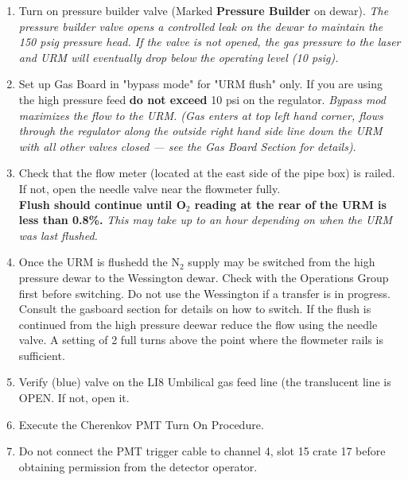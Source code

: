 \begin{enumerate}
\begin{center}
\end{center}
\item \CheckBox[name=li8p13]{} Turn on pressure builder valve (Marked {\bf Pressure Builder} on dewar). {\it The pressure builder valve opens a controlled leak on the dewar to maintain the 150 psig pressure head. If the valve is not opened, the gas pressure to the laser and URM will eventually drop below the operating level (10 psig).}
\item \CheckBox[name=li8p14]{} Set up Gas Board in "bypass mode" for "URM flush" only. If you are using the high pressure feed {\bf do not exceed} 10 psi on the regulator. {\it Bypass mod maximizes the flow to the URM. (Gas enters at top left hand corner, flows through the regulator along the outside right hand side line down the URM with all other valves closed --- see the Gas Board Section for details)}.
\item \CheckBox[name=li8p15]{} Check that the flow meter (located at the east side of the pipe box) is railed. If not, open the needle valve near the flowmeter fully.\\ {\bf Flush should continue until O$_{2}$ reading at the rear of the URM is less than 0.8\%.} {\it This may take up to an hour depending on when the URM was last flushed.}
\item \CheckBox[name=li8p16]{} Once the URM is flushedd the N$_{2}$ supply may be switched from the high pressure dewar to the Wessington dewar. Check with the Operations Group first before switching. Do not use the Wessington if a transfer is in progress. Consult the gasboard section for details on how to switch. If the flush is continued from the high pressure deewar reduce the flow using the needle valve. A setting of 2 full turns above the point where the flowmeter rails is sufficient.
\item \CheckBox[name=li8p17]{} Verify (blue) valve on the LI8 Umbilical gas feed line (the translucent line is OPEN. If not, open it.
\item \CheckBox[name=li8p18]{} Execute the Cherenkov PMT Turn On Procedure.
\item \CheckBox[name=li8p19]{} Do not connect the PMT trigger cable to channel 4, slot 15 crate 17 before obtaining permission from the detector operator.

\end{enumerate}
